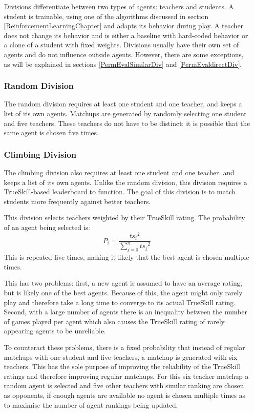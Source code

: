Divisions differentiate between two types of agents: teachers and students. A student is trainable, using one of the algorithms discussed in section \ref{ReinforcementLearningChapter} and adapts its behavior during play. A teacher does not change its behavior and is either a baseline with hard-coded behavior or a clone of a student with fixed weights. Divisions usually have their own set of agents and do not influence outside agents. However, there are some exceptions, as will be explained in sections \ref{PermEvalSimilarDiv} and \ref{PermEvaldirectDiv}.

\subsubsection{Random Division}
The random division requires at least one student and one teacher, and keeps a list of its own agents. Matchups are generated by randomly selecting one student and five teachers. These teachers do not have to be distinct; it is possible that the same agent is chosen five times.

\subsubsection{Climbing Division}
The climbing division also requires at least one student and one teacher, and keeps a list of its own agents. Unlike the random division, this division requires a TrueSkill-based leaderboard to function. The goal of this division is to match students more frequently against better teachers.

This division selects teachers weighted by their TrueSkill rating. The probability of an agent being selected is:
\begin{equation}
  P_i = \frac{{ts_i}^2}{\sum_{j=0}^{n} {ts_j}^2}
\end{equation}
This is repeated five times, making it likely that the best agent is chosen multiple times.

This has two problems: first, a new agent is assumed to have an average rating, but is likely one of the best agents. Because of this, the agent might only rarely play and therefore take a long time to converge to its actual TrueSkill rating. Second, with a large number of agents there is an inequality between the number of games played per agent which also causes the TrueSkill rating of rarely appearing agents to be unreliable.

To counteract these problems, there is a fixed probability that instead of regular matchups with one student and five teachers, a matchup is generated with six teachers. This has the sole purpose of improving the reliability of the TrueSkill ratings and therefore improving regular matchups. For this six teacher matchup a random agent is selected and five other teachers with similar ranking are chosen as opponents, if enough agents are available no agent is chosen multiple times as to maximise the number of agent rankings being updated.

